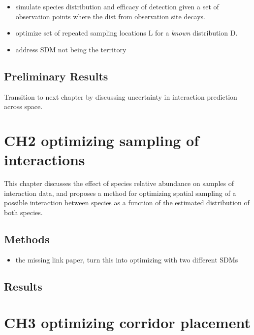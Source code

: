 \documentclass[11pt]{article}
\begin{document}
\begin{itemize}
\tightlist
\item
  simulate species distribution and efficacy of detection given a set of
  observation points where the dist from observation site decays.
\item
  optimize set of repeated sampling locations L for a \emph{known}
  distribution D.
\item
  address SDM not being the territory
\end{itemize}

\hypertarget{preliminary-results}{%
\subsection{Preliminary Results}\label{preliminary-results}}

Transition to next chapter by discussing uncertainty in interaction
prediction across space.

\hypertarget{ch2-optimizing-sampling-of-interactions}{%
\section{CH2 optimizing sampling of
interactions}\label{ch2-optimizing-sampling-of-interactions}}

This chapter discusses the effect of species relative abundance on
samples of interaction data, and proposes a method for optimizing
spatial sampling of a possible interaction between species as a function
of the estimated distribution of both species.

\hypertarget{methods-1}{%
\subsection{Methods}\label{methods-1}}

\begin{itemize}
\tightlist
\item
  the missing link paper, turn this into optimizing with two different
  SDMs
\end{itemize}

\hypertarget{results}{%
\subsection{Results}\label{results}}

\hypertarget{ch3-optimizing-corridor-placement}{%
\section{CH3 optimizing corridor
placement}\label{ch3-optimizing-corridor-placement}}
\end{document}
